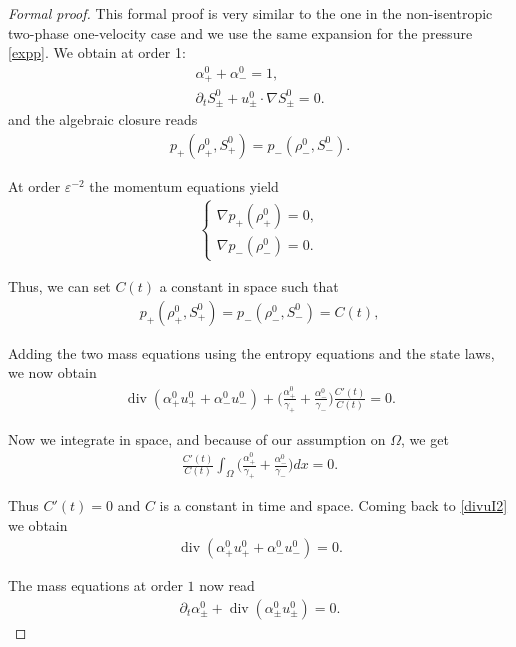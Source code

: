 \documentclass[11pt, twoside, a4paper]{article}
\theoremstyle{plain}
\theoremstyle{remark}
\numberwithin{equation}{section}
\renewcommand{\div}{\operatorname{div}}
\newcommand{\dt}{\partial_t}
\newcommand{\eps}{\varepsilon}
\newcommand{\ap}{\alpha_+}
\newcommand{\am}{\alpha_-}
\newcommand{\rp}{\rho_+}
\newcommand{\rmi}{\rho_-}
\newcommand{\gp}{\gamma_{+}}
\newcommand{\gm}{\gamma_-}
\begin{document}
\begin{proof}[Formal proof]
This formal proof is very similar to the one in the non-isentropic two-phase one-velocity case and we use the same expansion for the pressure \eqref{expp}. We obtain at order 1:
\begin{align*}
    \ap^0 + \am^0 = 1,\\
    \dt S_\pm^0 + u_\pm^0 \cdot \nabla S_\pm^0 = 0.
\end{align*}
and the algebraic closure reads
\begin{align*}
    p_+ (\rp^0,S_+^0) = p_-(\rmi^0,S_-^0).
\end{align*}

At order $\eps^{-2}$ the momentum equations yield
\begin{align*}
    \left\{
        \begin{array}{l}
              \nabla p_+(\rho_+^0) = 0, \\
              \nabla p_-(\rho_-^0) = 0.
        \end{array}
    \right.
\end{align*}

Thus, we can set $C(t)$ a constant in space such that
\begin{align*}
     p_+ (\rp^0,S_+^0) = p_-(\rmi^0,S_-^0) = C(t),
\end{align*}

Adding the two mass equations using the entropy equations and the state laws, we now obtain
\begin{align}
    \div (\ap^0 u_+^0 + \am^0 u_-^0) + \Big( \frac{\ap^0}{\gp} + \frac{\am^0}{\gm} \Big) \frac{C'(t)}{C(t)}=0.\label{divuI2}
\end{align}

Now we integrate in space, and because of our assumption on $\Omega$, we get
\begin{align*}
    \frac{C'(t)}{C(t)}\int_\Omega \Big( \frac{\ap^0}{\gp} + \frac{\am^0}{\gm} \Big) d x   =0.
\end{align*}

Thus $C'(t) = 0$ and $C$ is a constant in time and space. Coming back to \eqref{divuI2} we obtain
\begin{align*}
    \div (\ap^0 u_+^0 + \am^0 u_-^0) = 0.
\end{align*}



The mass equations at order $1$ now read
\begin{align*}
    \dt \alpha_\pm^0 + \div (\alpha_\pm^0 u_\pm^0)=0.
\end{align*}


\end{proof}
\end{document}
